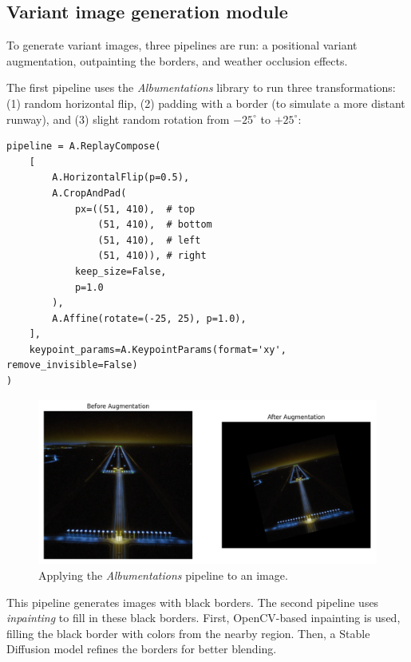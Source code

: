 \subsection{Variant image generation module}

To generate variant images, three pipelines are run: a positional variant augmentation, outpainting the borders, and weather occlusion effects.

The first pipeline uses the \emph{Albumentations} library \cite{???} to run three transformations: 
(1) random horizontal flip, 
(2) padding with a border (to simulate a more distant runway), and 
(3) slight random rotation from $-25^\circ$ to $+25^\circ$:

\begin{lstlisting}
pipeline = A.ReplayCompose(
    [
        A.HorizontalFlip(p=0.5),
        A.CropAndPad(
            px=((51, 410),  # top
                (51, 410),  # bottom
                (51, 410),  # left
                (51, 410)), # right
            keep_size=False,
            p=1.0
        ),
        A.Affine(rotate=(-25, 25), p=1.0),
    ],
    keypoint_params=A.KeypointParams(format='xy', remove_invisible=False)
)
\end{lstlisting}

\begin{figure}[htbp]
\centering
\includegraphics[width=1.0\textwidth]{figures/albumentations.png}
  \caption{Applying the \emph{Albumentations} pipeline to an image.}
\label{fig:noise_to_image}
\end{figure}

This pipeline generates images with black borders. 
The second pipeline uses \emph{inpainting} to fill in these black borders. 
First, OpenCV-based inpainting is used, filling the black border with colors from the nearby region. 
Then, a Stable Diffusion model refines the borders for better blending.

